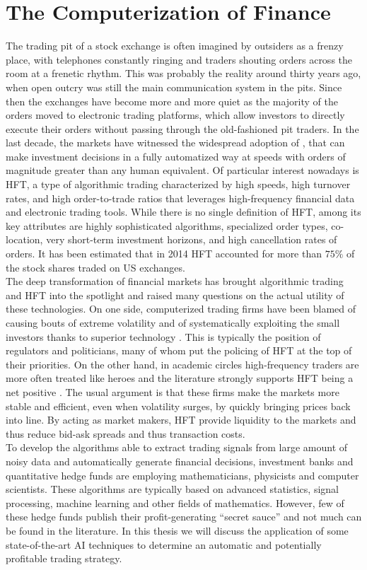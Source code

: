 \section{The Computerization of Finance}
The trading pit of a stock exchange is often imagined by outsiders as a frenzy place, with telephones constantly ringing and traders shouting orders across the room at a frenetic rhythm. This was probably the reality around thirty years ago, when open outcry was still the main communication system in the pits. Since then the exchanges have become more and more quiet as the majority of the orders moved to electronic trading platforms, which allow investors to directly execute their orders without passing through the old-fashioned pit traders. In the last decade, the markets have witnessed the widespread adoption of , that can make investment decisions in a fully automatized way at speeds with orders of magnitude greater than any human equivalent. Of particular interest nowadays is \gls{HFT}, a type of algorithmic trading characterized by high speeds, high turnover rates, and high order-to-trade ratios that leverages high-frequency financial data and electronic trading tools. While there is no single definition of HFT, among its key attributes are highly sophisticated algorithms, specialized order types, co-location, very short-term investment horizons, and high cancellation rates of orders. It has been estimated that in 2014 \gls{HFT} accounted for more than $75\%$ of the stock shares traded on US exchanges.\\
The deep transformation of financial markets has brought algorithmic trading and \gls{HFT} into the spotlight and raised many questions on the actual utility of these technologies. On one side, computerized trading firms have been blamed of causing bouts of extreme volatility and of systematically exploiting the small investors thanks to superior technology \cite{lewis2014flash}. This is typically the position of regulators and politicians, many of whom put the policing of \gls{HFT} at the top of their priorities. On the other hand, in academic circles high-frequency traders are more often treated like heroes and the literature strongly supports \gls{HFT} being a net positive \cite{brogaard2014high}. The usual argument is that these firms make the markets more stable and efficient, even when volatility surges, by quickly bringing prices back into line. By acting as market makers, \gls{HFT} provide liquidity to the markets and thus reduce bid-ask spreads and thus transaction costs.\\
To develop the algorithms able to extract trading signals from large amount of noisy data and automatically generate financial decisions, investment banks and quantitative hedge funds are employing mathematicians, physicists and computer scientists. These algorithms are typically based on advanced statistics, signal processing, machine learning and other fields of mathematics. However, few of these hedge funds publish their profit-generating ``secret sauce'' and not much can be found in the literature. In this thesis we will discuss the application of some state-of-the-art \gls{AI} techniques to determine an automatic and potentially profitable trading strategy.

